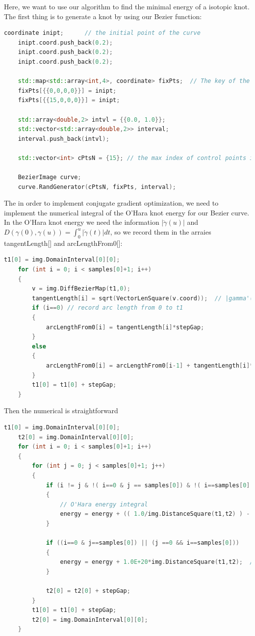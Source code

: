 \documentclass[12pt]{article}
\begin{document}
Here, we want to use our algorithm to find the minimal energy of a isotopic knot.
The first thing is to generate a knot by using our Bezier function:
%
\begin{lstlisting}[language=c++]
	coordinate inipt;      // the initial point of the curve
    inipt.coord.push_back(0.2);
    inipt.coord.push_back(0.2);
    inipt.coord.push_back(0.2);

    std::map<std::array<int,4>, coordinate> fixPts;  // The key of the dictionary must be array<int,4> which corresponds to P_{ijkl} of Bezier function X(x,y,z,w)=P_{ijkl}B_i(x)B_j(y)B_k(z)B_l(w). And we only use the first index of array<int,4> for one dimensional curve.
    fixPts[{{0,0,0,0}}] = inipt;
    fixPts[{{15,0,0,0}}] = inipt;

    std::array<double,2> intvl = {{0.0, 1.0}};
    std::vector<std::array<double,2>> interval;
    interval.push_back(intvl);	

	std::vector<int> cPtsN = {15}; // the max index of control points in each dimension

	BezierImage curve;
	curve.RandGenerator(cPtsN, fixPts, interval); 
\end{lstlisting}


The in order to implement conjugate gradient optimization, we need to implement the numerical integral of the O'Hara knot energy for our Bezier curve.
In the O'Hara knot energy we need the information $|\dot{\gamma}(u)|$ and $D(\gamma (0),\gamma (u)) = \int_0^u |\dot{\gamma}(t)|dt$, so we record them in the arraies \textsf{tangentLength[]} and \textsf{arcLengthFrom0[]}:
%
\begin{lstlisting}[language=c++]
	t1[0] = img.DomainInterval[0][0];
	for (int i = 0; i < samples[0]+1; i++)
	{
		v = img.DiffBezierMap(t1,0);
		tangentLength[i] = sqrt(VectorLenSquare(v.coord));  // |gamma'(t1)|
		if (i==0) // record arc length from 0 to t1
		{
			arcLengthFrom0[i] = tangentLength[i]*stepGap;
		}
		else
		{
			arcLengthFrom0[i] = arcLengthFrom0[i-1] + tangentLength[i]*stepGap;
		}
		t1[0] = t1[0] + stepGap;
	}
\end{lstlisting}
%
Then the numerical is straightforward
%
\begin{lstlisting}[language=c++]
	t1[0] = img.DomainInterval[0][0];
	t2[0] = img.DomainInterval[0][0];
	for (int i = 0; i < samples[0]+1; i++)
	{
		for (int j = 0; j < samples[0]+1; j++)
		{
			if (i != j & !( i==0 & j == samples[0]) & !( i==samples[0] & j == 0))
			{
				// O'Hara energy integral
				energy = energy + (( 1.0/img.DistanceSquare(t1,t2) ) - ( 1.0/pow(std::min(abs(arcLengthFrom0[i]-arcLengthFrom0[j]),arcLengthFrom0[samples[0]]-abs(arcLengthFrom0[i]-arcLengthFrom0[j])), 2) )) * tangentLength[i] * tangentLength[j];                        
			}

			if ((i==0 & j==samples[0]) || (j ==0 && i==samples[0]))
			{
				energy = energy + 1.0E+20*img.DistanceSquare(t1,t2);  // inforce the start point and end point can not change too much.
			}

			t2[0] = t2[0] + stepGap;
		}
		t1[0] = t1[0] + stepGap;
		t2[0] = img.DomainInterval[0][0];
	}
\end{lstlisting}
\end{document}
